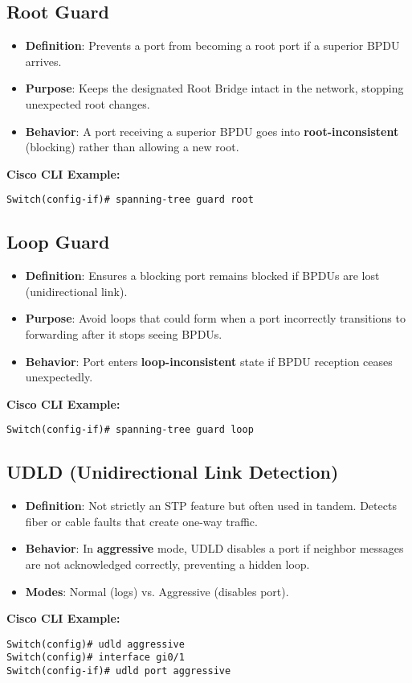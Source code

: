 \documentclass[a4paper]{report}
\begin{document}
\subsection{Root Guard}
\begin{itemize}
    \item \textbf{Definition}: Prevents a port from becoming a root port if a superior BPDU arrives.
    \item \textbf{Purpose}: Keeps the designated Root Bridge intact in the network, stopping unexpected root changes.
    \item \textbf{Behavior}: A port receiving a superior BPDU goes into \textbf{root-inconsistent} (blocking) rather than allowing a new root.
\end{itemize}
\textbf{Cisco CLI Example:}
\begin{lstlisting}
Switch(config-if)# spanning-tree guard root
\end{lstlisting}

\subsection{Loop Guard}
\begin{itemize}
    \item \textbf{Definition}: Ensures a blocking port remains blocked if BPDUs are lost (unidirectional link).
    \item \textbf{Purpose}: Avoid loops that could form when a port incorrectly transitions to forwarding after it stops seeing BPDUs.
    \item \textbf{Behavior}: Port enters \textbf{loop-inconsistent} state if BPDU reception ceases unexpectedly.
\end{itemize}
\textbf{Cisco CLI Example:}
\begin{lstlisting}
Switch(config-if)# spanning-tree guard loop
\end{lstlisting}

\subsection{UDLD (Unidirectional Link Detection)}
\begin{itemize}
    \item \textbf{Definition}: Not strictly an STP feature but often used in tandem. Detects fiber or cable faults that create one-way traffic.
    \item \textbf{Behavior}: In \textbf{aggressive} mode, UDLD disables a port if neighbor messages are not acknowledged correctly, preventing a hidden loop.
    \item \textbf{Modes}: Normal (logs) vs. Aggressive (disables port).
\end{itemize}
\textbf{Cisco CLI Example:}
\begin{lstlisting}
Switch(config)# udld aggressive
Switch(config)# interface gi0/1
Switch(config-if)# udld port aggressive
\end{lstlisting}
\end{document}
